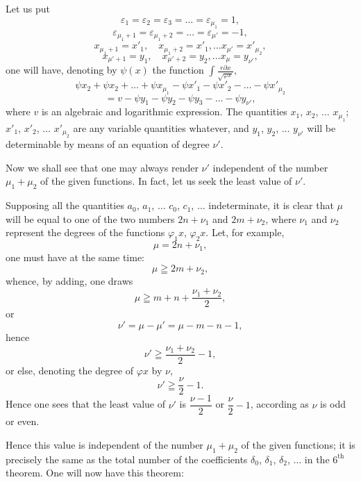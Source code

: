 \documentclass{article}
\begin{document}
Let us put
\[ \varepsilon_1 = \varepsilon_2 = \varepsilon_3 = \ldots = \varepsilon_{\mu_1} = 1, \]
\[ \varepsilon_{\mu_1+1} = \varepsilon_{\mu_1+2} = \ldots = \varepsilon_{\mu'} = -1, \]
\[ x_{\mu_1+1} = x'_1, \quad x_{\mu_1+2} = x'_1, \ldots x_{\mu'} = x'_{\mu_2}, \]
\[ x_{\mu'+1} = y_1, \quad x_{\mu'+2} = y_2, \ldots x_\mu = y_{\nu'}, \]
one will have, denoting by $\psi(x)$ the function $\displaystyle\int \frac{r\partial x}{\sqrt{\varphi x}}$,
\[ \psi x_2 + \psi x_2 + \ldots + \psi x_{\mu_1} - \psi x'_1 - \psi x'_2 - \ldots - \psi x'_{\mu_2} \tag{37} \]
\[ = v - \psi y_1 - \psi y_2 - \psi y_3 - \ldots - \psi y_{\nu'}, \]
where $v$ is an algebraic and logarithmic expression. The quantities $x_1$, $x_2$, $\ldots$ $x_{\mu_1}$; $x'_1$, $x'_2$, $\ldots$ $x'_{\mu_2}$ are any variable quantities whatever, and $y_1$, $y_2$, $\ldots$ $y_{\nu'}$ will be determinable by means of an equation of degree $\nu'$.

Now we shall see that one may always render $\nu'$ independent of the number $\mu_1+\mu_2$ of the given functions. In fact, let us seek the least value of $\nu'$.

Supposing all the quantities $a_0$, $a_1$, $\ldots$ $c_0$, $c_1$, $\ldots$ indeterminate, it is clear that $\mu$ will be equal to one of the two numbers $2n+\nu_1$ and $2m+\nu_2$, where $\nu_1$ and $\nu_2$ represent the degrees of the functions $\varphi_1 x$, $\varphi_2 x$. Let, for example,
\[ \mu = 2n+\nu_1, \]
one must have at the same time:
\[ \mu \geqq 2m+\nu_2, \]
whence, by adding, one draws
\[ \mu \geqq m+n+\frac{\nu_1+\nu_2}{2}, \]
or
\[ \nu' = \mu-\mu' = \mu-m-n-1, \]
hence
\[ \nu' \geqq \frac{\nu_1+\nu_2}{2}-1, \]
or else, denoting the degree of $\varphi x$ by $\nu$,
\[ \nu' \geqq \frac{\nu}{2}-1. \tag{38} \]
Hence one sees that the least value of $\nu'$ is $\dfrac{\nu-1}{2}$ or $\dfrac{\nu}{2}-1$, according as $\nu$ is odd or even.

Hence this value is independent of the number $\mu_1+\mu_2$ of the given functions; it is precisely the same as the total number of the
coefficients $\delta_0$, $\delta_1$, $\delta_2$, $\ldots$ in the $6^{\text{th}}$ theorem. One will now have this theorem:
\end{document}
